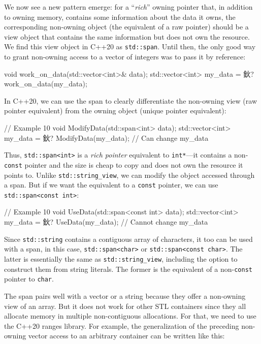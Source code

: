 We now see a new pattern emerge: for a ``\emph{rich}'' owning pointer that, in addition to owning memory, contains some information about the data it owns, the corresponding non-owning object (the equivalent of a raw pointer) should be a view object that contains the same information but does not own the resource. We find this view object in C++20 as \texttt{std::span}. Until then, the only good way to grant non-owning access to a vector of integers was to pass it by reference:

\begin{code}
void work_on_data(std::vector<int>& data);
std::vector<int> my_data = 鈥?
work_on_data(my_data);
\end{code}

In C++20, we can use the span to clearly differentiate the non-owning view (raw pointer equivalent) from the owning object (unique pointer equivalent):

\begin{code}
// Example 10
void ModifyData(std::span<int> data);
std::vector<int> my_data = 鈥?
ModifyData(my_data); // Can change my_data
\end{code}

Thus, \texttt{std::span\textless{}int\textgreater{}} is a \emph{rich pointer} equivalent to \texttt{int*}---it contains a non-\texttt{const} pointer and the size is cheap to copy and does not own the resource it points to. Unlike \texttt{std::string\_view}, we can modify the object accessed through a span. But if we want the equivalent to a \texttt{const} pointer, we can use \texttt{std::span\textless{}const\ int\textgreater{}}:

\begin{code}
// Example 10
void UseData(std::span<const int> data);
std::vector<int> my_data = 鈥?
UseData(my_data); // Cannot change my_data
\end{code}

Since \texttt{std::string} contains a contiguous array of characters, it too can be used with a span, in this case, \texttt{std::span\textless{}char\textgreater{}} or \texttt{std::span\textless{}const\ char\textgreater{}}. The latter is essentially the same as \texttt{std::string\_view}, including the option to construct them from string literals. The former is the equivalent of a non-\texttt{const} pointer to \texttt{char}.

The span pairs well with a vector or a string because they offer a non-owning view of an array. But it does not work for other STL containers since they all allocate memory in multiple non-contiguous allocations. For that, we need to use the C++20 ranges library. For example, the generalization of the preceding non-owning vector access to an arbitrary container can be written like this:

